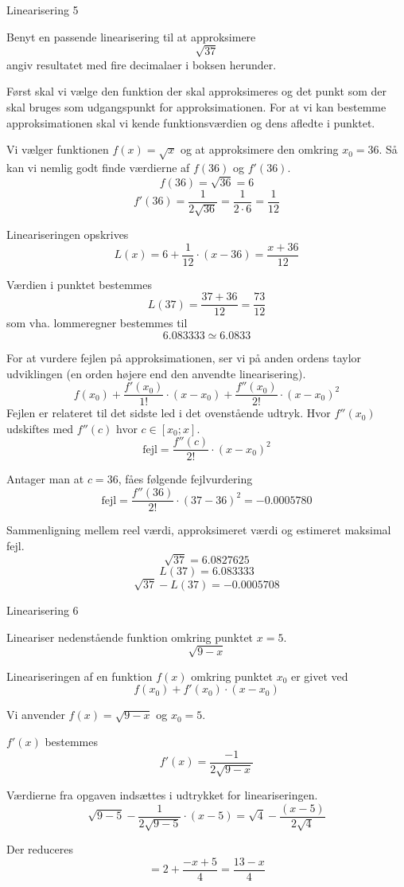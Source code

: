 \documentclass{article}
\begin{document}
\begin{exercise}{Linearisering 5}
	
	Benyt en passende linearisering til at approksimere
	\[
	\sqrt{37}
	\]
	angiv resultatet med fire decimalaer i boksen herunder.
	
	\hint
	Først skal vi vælge den funktion der skal approksimeres
	og det punkt som der skal bruges som udgangspunkt for 
	approksimationen.
	For at vi kan bestemme approksimationen skal vi 
	kende funktionsværdien og dens afledte i punktet.
	
	\hint
	Vi vælger funktionen $f(x) = \sqrt{x}$ og at approksimere den 
	omkring $x_0 = 36$.
	Så kan vi nemlig godt finde værdierne af $f(36)$ og $f'(36)$.
	\[
	f(36) = \sqrt{36} = 6
	\]
	\[
	f'(36) = \frac{1}{2 \sqrt{36}} = \frac{1}{2 \cdot 6 } = \frac{1}{12}
	\]
	
	\hint
	Lineariseringen opskrives
	\[
	L(x) = 6 + \frac{1}{12} \cdot (x - 36) = \frac{x + 36}{12}
	\]
	
	\hint
	Værdien i punktet bestemmes
	\[
	L(37) = \frac{37 + 36}{12} = \frac{73}{12}
	\]
	som vha. lommeregner bestemmes til 
	\[
	6.083333 \simeq 6.0833
	\]
	
	\hint

	For at vurdere fejlen på approksimationen, ser vi på anden 
	ordens taylor udviklingen (en orden højere end den 
	anvendte linearisering).
	\[
	f(x_0) 
	+ \frac{f'(x_0)}{1!} \cdot (x - x_0) 
	+ \frac{f''(x_0)}{2!} \cdot (x - x_0)^2
	\]
	Fejlen er relateret til det sidste led i det ovenstående udtryk.
	Hvor $f''(x_0)$ udskiftes med $f''(c)$ hvor $c \in [x_0; x]$.
	\[
	\textrm{fejl} = \frac{f''(c)}{2!} \cdot (x - x_0)^2
	\]
	
	\hint 
	Antager man at $c = 36$, fåes følgende fejlvurdering
	\[
	\textrm{fejl} = \frac{f''(36)}{2!} \cdot (37 - 36)^2 = 
	-0.0005780
	\]
	
	\hint
	Sammenligning mellem reel værdi, approksimeret værdi og estimeret maksimal fejl.
	\[
	\sqrt{37}= 6.0827625
	\]
	\[
	L(37) = 6.083333
	\]
	\[
	\sqrt{37} - L(37)  = -0.0005708
	\]
	
\end{exercise}

\begin{exercise}{Linearisering 6}

	Lineariser nedenstående funktion omkring punktet $x = 5$.
	\[
	\sqrt{9-x}
	\]
	
	
	\hint
	Lineariseringen af en funktion $f(x)$
	omkring punktet $x_0$ er givet ved
	\[
	f(x_0) + f'(x_0) \cdot (x - x_0)
	\]
	
	\hint
	Vi anvender $f(x) = \sqrt{9-x}$ og $x_0 = 5$.
	
	\hint
	$f'(x)$ bestemmes
	\[
	f'(x) = \frac{-1}{2 \sqrt{9 - x}}
	\]
	
	\hint
	Værdierne fra opgaven indsættes i udtrykket for lineariseringen.
	\[
	\sqrt{9 - 5} - \frac{1}{2 \sqrt{9 - 5}} \cdot (x - 5) = \sqrt{4} - \frac{(x-5)}{2 \sqrt{4}} 
	\]
	
	\hint
	Der reduceres
	\[
	= 2 + \frac{-x + 5}{4} = \frac{13 - x}{4}
	\]
	
\end{exercise}
\end{document}
